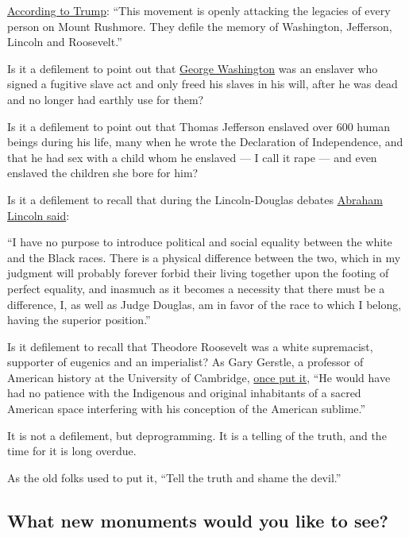 \href{https://www.whitehouse.gov/briefings-statements/remarks-president-trump-south-dakotas-2020-mount-rushmore-fireworks-celebration-keystone-south-dakota/}{According
to Trump}: ``This movement is openly attacking the legacies of every
person on Mount Rushmore. They defile the memory of Washington,
Jefferson, Lincoln and Roosevelt.''

Is it a defilement to point out that
\href{https://www.nytimes3xbfgragh.onion/2020/06/28/opinion/george-washington-confederate-statues.html}{George
Washington} was an enslaver who signed a fugitive slave act and only
freed his slaves in his will, after he was dead and no longer had
earthly use for them?

Is it a defilement to point out that Thomas Jefferson enslaved over 600
human beings during his life, many when he wrote the Declaration of
Independence, and that he had sex with a child whom he enslaved --- I
call it rape --- and even enslaved the children she bore for him?

Is it a defilement to recall that during the Lincoln-Douglas debates
\href{https://www.stjoe.k12.in.us/ourpages/auto/2011/11/14/53458274/Lincoln-Douglas\%20Debates_\%20Excerpts.pdf}{Abraham
Lincoln said}:

``I have no purpose to introduce political and social equality between
the white and the Black races. There is a physical difference between
the two, which in my judgment will probably forever forbid their living
together upon the footing of perfect equality, and inasmuch as it
becomes a necessity that there must be a difference, I, as well as Judge
Douglas, am in favor of the race to which I belong, having the superior
position.''

Is it defilement to recall that Theodore Roosevelt was a white
supremacist, supporter of eugenics and an imperialist? As Gary Gerstle,
a professor of American history at the University of Cambridge,
\href{https://www.wbur.org/hereandnow/2019/03/21/teddy-roosevelt-legacy-100-years}{once
put it}, ``He would have had no patience with the Indigenous and
original inhabitants of a sacred American space interfering with his
conception of the American sublime.''

It is not a defilement, but deprogramming. It is a telling of the truth,
and the time for it is long overdue.

As the old folks used to put it, ``Tell the truth and shame the devil.''

\hypertarget{what-new-monuments-would-you-like-to-see}{%
\subsection{What new monuments would you like to
see?}\label{what-new-monuments-would-you-like-to-see}}

